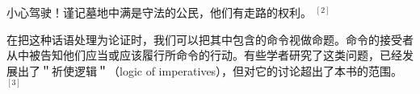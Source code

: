 \begin{displayquote}
小心驾驶！谨记墓地中满是守法的公民，他们有走路的权利。 $^{[2]}$
\end{displayquote}

在把这种话语处理为论证时，我们可以把其中包含的命令视做命题。命令的接受者从中被告知他们应当或应该履行所命令的行动。有些学者研究了这类问题，已经发展出了＂祈使逻辑＂（logic of imperatives），但对它的讨论超出了本书的范围。 $^{[3]}$ 

\begin{center}
\end{center} 